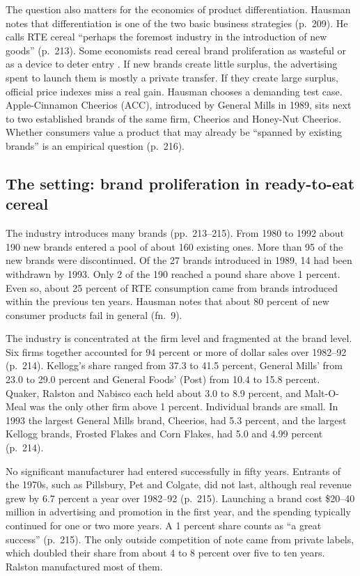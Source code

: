 The question also matters for the economics of product differentiation. Hausman notes that differentiation is
one of the two basic business strategies (p.~209). He calls RTE cereal ``perhaps the foremost industry in the
introduction of new goods'' (p.~213). Some economists read cereal brand
proliferation as wasteful or as a device to deter entry \citep{Schmalensee1978}. If new brands create
little surplus, the advertising spent to launch them is mostly a private transfer. If they create large
surplus, official price indexes miss a real gain. Hausman chooses a demanding test case. Apple-Cinnamon
Cheerios (ACC), introduced by General Mills in 1989, sits next to two established brands of the same firm,
Cheerios and Honey-Nut Cheerios. Whether consumers value a product that may already be ``spanned by existing
brands'' is an empirical question (p.~216).

\subsection{The setting: brand proliferation in ready-to-eat cereal}\label{sec:10-hausman-setting}

The industry introduces many brands (pp.~213--215). From 1980 to 1992 about 190 new brands
entered a pool of about 160 existing ones. More than 95 of the new brands were discontinued. Of the 27
brands introduced in 1989, 14 had been withdrawn by 1993. Only 2 of the 190 reached a pound share above
1 percent. Even so, about 25 percent of RTE consumption came from brands introduced within the previous ten
years. Hausman notes that about 80 percent of new consumer products fail in general (fn.~9).

The industry is concentrated at the firm level and fragmented at the brand level. Six firms together
accounted for 94 percent or more of dollar sales over 1982--92 (p.~214). Kellogg's share ranged from 37.3 to
41.5 percent, General Mills' from 23.0 to 29.0 percent and General Foods' (Post) from 10.4 to 15.8 percent.
Quaker, Ralston and Nabisco each held about 3.0 to 8.9 percent, and Malt-O-Meal was the only other firm
above 1 percent. Individual brands are small. In 1993 the largest General Mills brand, Cheerios, had 5.3
percent, and the largest Kellogg brands, Frosted Flakes and Corn Flakes, had 5.0 and 4.99 percent (p.~214).

No significant manufacturer had entered successfully in fifty years. Entrants of the 1970s, such as
Pillsbury, Pet and Colgate, did not last, although real revenue grew by 6.7 percent a year over 1982--92
(p.~215). Launching a brand cost \$20--40 million in advertising and promotion in the first year, and the
spending typically continued for one or two more years. A 1 percent share counts as ``a great success''
(p.~215). The only outside competition of note came from private labels, which doubled their share from
about 4 to 8 percent over five to ten years. Ralston manufactured most of them.

